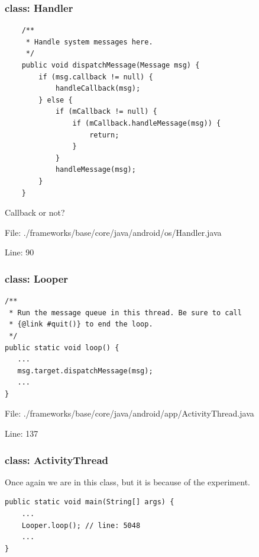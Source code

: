 \documentclass[11pt,a4paper]{beamer}
\begin{document}
\begin{frame}[fragile]
\frametitle{class: Handler}

\scriptsize
\begin{verbatim}
    /**
     * Handle system messages here.
     */
    public void dispatchMessage(Message msg) {
        if (msg.callback != null) {
            handleCallback(msg);
        } else {
            if (mCallback != null) {
                if (mCallback.handleMessage(msg)) {
                    return;
                }
            }
            handleMessage(msg);
        }
    }
\end{verbatim}
\normalsize

Callback or not?

File: ./frameworks/base/core/java/android/os/Handler.java

Line: 90
\end{frame}





\begin{frame}[fragile]
\frametitle{class: Looper}



\scriptsize\begin{verbatim}
/**
 * Run the message queue in this thread. Be sure to call
 * {@link #quit()} to end the loop.
 */
public static void loop() {
   ...
   msg.target.dispatchMessage(msg);
   ...
}
\end{verbatim}
\normalsize

File: ./frameworks/base/core/java/android/app/ActivityThread.java

Line: 137
\end{frame}


\begin{frame}[fragile]
\frametitle{class: ActivityThread}
Once again we are in this class, but it is because of the experiment.
\scriptsize
\begin{verbatim}
public static void main(String[] args) {
    ...
    Looper.loop(); // line: 5048
    ...
}
\end{verbatim}
\normalsize

\end{frame}
\end{document}
